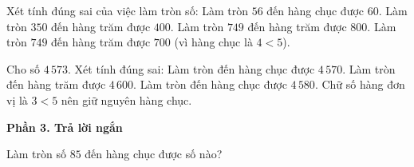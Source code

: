 \begin{ex} %
Xét tính đúng sai của việc làm tròn số:
\choiceTF
{\True Làm tròn $56$ đến hàng chục được $60$.}
{\True Làm tròn $350$ đến hàng trăm được $400$.}
{Làm tròn $749$ đến hàng trăm được $800$.}
{\True Làm tròn $749$ đến hàng trăm được $700$ (vì hàng chục là $4 < 5$).}
\end{ex}

\begin{ex} %
Cho số $4\,573$. Xét tính đúng sai:
\choiceTF
{\True Làm tròn đến hàng chục được $4\,570$.}
{\True Làm tròn đến hàng trăm được $4\,600$.}
{Làm tròn đến hàng chục được $4\,580$.}
{\True Chữ số hàng đơn vị là $3 < 5$ nên giữ nguyên hàng chục.}
\end{ex}

\textbf{Phần 3. Trả lời ngắn}

\begin{ex} %
Làm tròn số $85$ đến hàng chục được số nào?
\end{ex}

